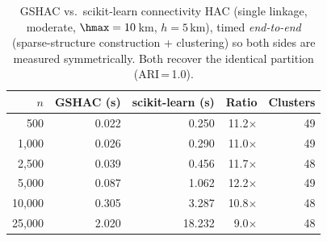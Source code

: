 \begin{table}[t]
\caption{GSHAC vs.\ scikit-learn connectivity HAC (single linkage,
  moderate, \(\hmax = 10\)\,km, \(h = 5\)\,km), timed
  \emph{end-to-end} (sparse-structure construction + clustering) so both
  sides are measured symmetrically. Both recover the identical partition
  (ARI\,=\,1.0).}
\label{tab:sklearn}
\small
\begin{tabular}{r r r r r}
\toprule
\(n\) & GSHAC (s) & scikit-learn (s) & Ratio & Clusters \\
\midrule
500 & 0.022 & 0.250 & 11.2$\times$ & 49 \\
1{,}000 & 0.026 & 0.290 & 11.0$\times$ & 49 \\
2{,}500 & 0.039 & 0.456 & 11.7$\times$ & 48 \\
5{,}000 & 0.087 & 1.062 & 12.2$\times$ & 49 \\
10{,}000 & 0.305 & 3.287 & 10.8$\times$ & 48 \\
25{,}000 & 2.020 & 18.232 & 9.0$\times$ & 48 \\
\bottomrule
\end{tabular}
\end{table}
